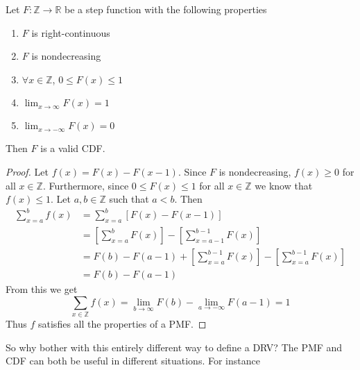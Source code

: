 \documentclass{report}
\begin{document}
\begin{theorem}
    Let $F:\mathbb Z\to\mathbb R$ be a step function with the following properties
    \begin{enumerate}
        \item $F$ is right-continuous
        \item $F$ is nondecreasing
        \item $\forall x\in\mathbb Z$, $0\le F(x) \le 1$
        \item $\displaystyle\lim_{x\to\infty} F(x)=1$
        \item $\displaystyle\lim_{x\to -\infty} F(x)=0$
    \end{enumerate}
    Then $F$ is a valid CDF.
    \begin{proof}
        Let $f(x)=F(x)-F(x-1)$. Since $F$ is nondecreasing, $f(x)\ge 0$ for all $x\in\mathbb Z$. Furthermore, since $0\le F(x) \le 1$ for all $x\in\mathbb Z$ we know that $f(x)\le 1$. Let $a,b\in\mathbb Z$ such that $a<b$. Then
        \begin{align*}
            \sum_{x=a}^b f(x) & = \sum_{x=a}^b\left[F(x)-F(x-1)\right]
            \\                & = \left[\sum_{x=a}^b F(x)\right] - \left[\sum_{x=a-1}^{b-1} F(x)\right]
            \\                & = F(b)-F(a-1)+\left[\sum_{x=a}^{b-1} F(x)\right] - \left[\sum_{x=a}^{b-1} F(x)\right]
            \\                & = F(b)-F(a-1)
        \end{align*}
        From this we get
        \[
            \sum_{x\in\mathbb Z} f(x)=\lim_{b\to \infty} F(b) - \lim_{a\to -\infty} F(a-1)=1
        \]
        Thus $f$ satisfies all the properties of a PMF.
    \end{proof}
\end{theorem}


So why bother with this entirely different way to define a DRV? The PMF and CDF can both be useful in different situations. For instance
\end{document}
